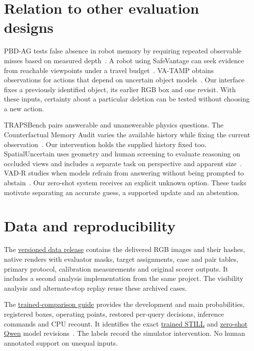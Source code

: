 \section{Relation to other evaluation designs}
\label{app:related}

PBD-AG tests false absence in robot memory by requiring repeated observable misses based on measured depth~\citep{pbdag}. A robot using SafeVantage can seek evidence from reachable viewpoints under a travel budget~\citep{safevantage}. VA-TAMP obtains observations for actions that depend on uncertain object models~\citep{vatamp}. Our interface fixes a previously identified object, its earlier RGB box and one revisit. With these inputs, certainty about a particular deletion can be tested without choosing a new action.

TRAPSBench pairs answerable and unanswerable physics questions. The Counterfactual Memory Audit varies the available history while fixing the current observation~\citep{trapsbench,cma}. Our intervention holds the supplied history fixed too. SpatialUncertain uses geometry and human screening to evaluate reasoning on occluded views and includes a separate task on perspective and apparent size~\citep{spatialuncertain}. VAD-R studies when models refrain from answering without being prompted to abstain~\citep{vad-r}. Our zero-shot system receives an explicit unknown option. These tasks motivate separating an accurate guess, a supported update and an abstention.

\section{Data and reproducibility}
\label{app:data}

The \href{https://github.com/Adithya-Rajendran/cmpe249-active-verification/releases/tag/scene-memory-audit-v1}{versioned data release} contains the delivered RGB images and their hashes, native renders with evaluator masks, target assignments, case and pair tables, primary protocol, calibration measurements and original scorer outputs. It includes a second analysis implementation from the same project. The visibility analysis and alternate-stop replay reuse these archived cases.

The \href{https://github.com/Adithya-Rajendran/cmpe249-active-verification/blob/a88d89fc5c92f4f18f7a7a1d5947bc59f3b37161/paper/README.md\#reproduce-the-trained-still-comparison}{trained-comparison guide} provides the development and main probabilities, registered boxes, operating points, restored per-query decisions, inference commands and CPU recount. It identifies the exact \href{https://huggingface.co/oran9er/STILL-Qwen3.5-9B/tree/81d9373e1dd9c07c537d5fb2436b36a26a2206b4}{trained STILL} and \href{https://huggingface.co/Qwen/Qwen3.5-9B/tree/c202236235762e1c871ad0ccb60c8ee5ba337b9a}{zero-shot Qwen} model revisions~\citep{still-weights,qwen-weights}. The labels record the simulator intervention. No human annotated support on unequal inputs.
